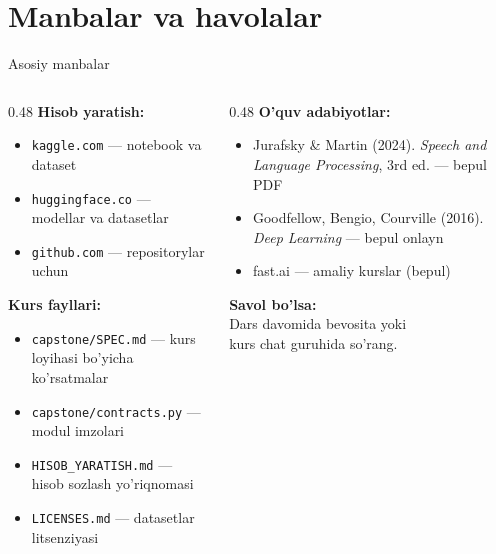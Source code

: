 \documentclass[aspectratio=169,11pt]{beamer}
\begin{document}
\section[Manbalar]{Manbalar va havolalar}

\begin{frame}{Asosiy manbalar}
  \begin{columns}
    \begin{column}{0.48\textwidth}
      \textbf{Hisob yaratish:}
      \begin{itemize}\setlength\itemsep{3pt}
        \item \texttt{kaggle.com} --- notebook va dataset
        \item \texttt{huggingface.co} --- modellar va datasetlar
        \item \texttt{github.com} --- repositorylar uchun
      \end{itemize}
      \vspace{0.5em}
      \textbf{Kurs fayllari:}
      \begin{itemize}\setlength\itemsep{3pt}
        \item \texttt{capstone/SPEC.md} --- kurs loyihasi bo'yicha ko'rsatmalar 
        \item \texttt{capstone/contracts.py} --- modul imzolari
        \item \texttt{HISOB\_YARATISH.md} --- hisob sozlash yo'riqnomasi
        \item \texttt{LICENSES.md} --- datasetlar litsenziyasi
      \end{itemize}
    \end{column}
    \begin{column}{0.48\textwidth}
      \textbf{O'quv adabiyotlar:}
      \begin{itemize}\setlength\itemsep{3pt}
        \item Jurafsky \& Martin (2024). \textit{Speech and Language Processing}, 3rd ed. --- bepul PDF
        \item Goodfellow, Bengio, Courville (2016). \textit{Deep Learning} --- bepul onlayn
        \item fast.ai --- amaliy kurslar (bepul)
      \end{itemize}
      \vspace{0.5em}
      \begin{tcolorbox}[okbox]
        \small \textbf{Savol bo'lsa:}\\
        Dars davomida bevosita yoki\\
        kurs chat guruhida so'rang.
      \end{tcolorbox}
    \end{column}
  \end{columns}
\end{frame}
\end{document}
